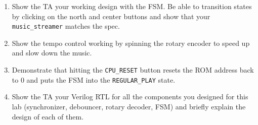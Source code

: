 \documentclass[11pt]{article}
\begin{document}
\begin{enumerate}
	\item Show the TA your working design with the FSM. Be able to transition states by clicking on the north and center buttons and show that your \verb|music_streamer| matches the spec.
	
	\item Show the tempo control working by spinning the rotary encoder to speed up and slow down the music.
	
	\item Demonstrate that hitting the \verb|CPU_RESET| button resets the ROM address back to 0 and puts the FSM into the \verb|REGULAR_PLAY| state.
	
	\item Show the TA your Verilog RTL for all the components you designed for this lab (synchronizer, debouncer, rotary decoder, FSM) and briefly explain the design of each of them.
\end{enumerate}
\end{document}
